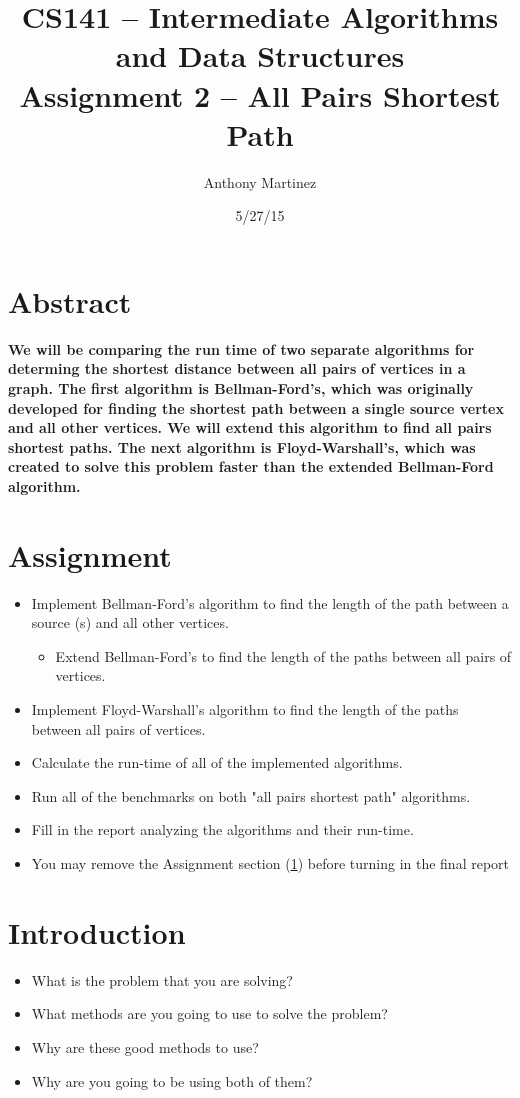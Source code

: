 \documentclass[twocolumn]{article}
\title{CS141 -- Intermediate Algorithms and Data Structures\\Assignment 2 -- All
Pairs Shortest Path}
\author{Anthony Martinez}
\date{5/27/15}
\begin{document}
\maketitle

\section*{Abstract}
\textbf{\small We will be comparing the run time of two separate algorithms for determing the shortest distance between
all pairs of vertices in a graph. The first algorithm is Bellman-Ford's, which was originally developed for
finding the shortest path between a single source vertex and all other vertices. We will extend this algorithm to find
all pairs shortest paths. The next algorithm is Floyd-Warshall's, which was created to solve this problem faster than
the extended Bellman-Ford algorithm.}

\section{Assignment}
\label{sec::assignment}
\begin{itemize}
    \item Implement Bellman-Ford's algorithm to find the length of the path between a source (s) and all other vertices.
    \begin{itemize}
        \item Extend Bellman-Ford's to find the length of the paths between all pairs of vertices.
    \end{itemize}
    \item Implement Floyd-Warshall's algorithm to find the length of the paths between all pairs of vertices.
    \item Calculate the run-time of all of the implemented algorithms.
    \item Run all of the benchmarks on both "all pairs shortest path" algorithms.
    \item Fill in the report analyzing the algorithms and their run-time.
    \item You may remove the Assignment section (\cref{sec::assignment}) before turning in the final report
\end{itemize}

\section{Introduction}
\begin{itemize}
    \item What is the problem that you are solving?
    \item What methods are you going to use to solve the problem?
    \item Why are these good methods to use?
    \item Why are you going to be using both of them?
\end{itemize}
\end{document}
